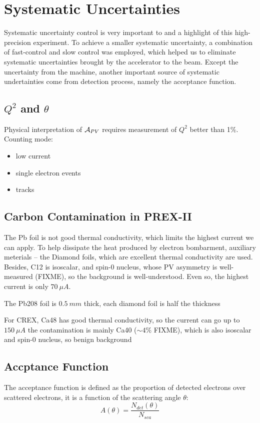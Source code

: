 \chapter{Systematic Uncertainties}

Systematic uncertainty control is very important to and a highlight of this 
high-precision experiment. To achieve a smaller systematic uncertainty, a
combination of fast-control and slow control was employed, which helped us
to eliminate systematic uncertainties brought by the accelerator to the
beam. Except the uncertainty from the machine, another important source
of systematic undertainties come from detection process, namely the 
acceptance function.

\section{$Q^2$ and $\theta$}
Physical interpretation of $\mathcal{A}_{PV}$ requires measurement of $Q^2$ better
than 1\%.
Counting mode:
\begin{itemize}
    \item low current
    \item single electron events
    \item tracks 
\end{itemize}

\section{Carbon Contamination in PREX-II}
The Pb foil is not good thermal conductivity, which limits the highest current
we can apply. To help dissipate the heat produced
by electron bombarment, auxiliary meterials -- the Diamond foils, which are 
excellent thermal conductivity are used. Besides, C12 is isoscalar, and spin-0 
nucleus, whose PV asymmetry is well-measured (FIXME), so the background is 
well-understood. Even so, the highest current is only $70 \ \mu A$.

The Pb208 foil is $0.5\ mm$ thick, each diamond foil is half the thickness 

For CREX, Ca48 has good thermal conductivity, so the current can go up to $150\ \mu A$
the contamination is mainly Ca40 ($\sim 4\%$ FIXME), which is also isoscalar
and spin-0 nucleus, so benign background

\section{Accptance Function}
The acceptance function is defined as the proportion of detected electrons
over scattered electrons, it is a function of the scattering angle $\theta$:
$$ A(\theta) = \frac{N_{det}(\theta)}{N_{sca}} $$

